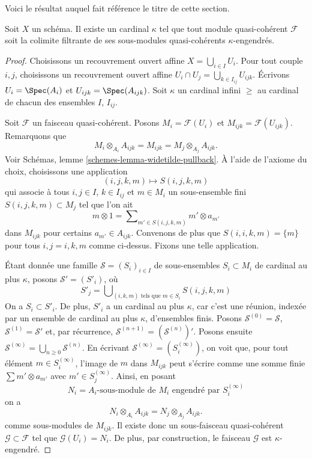\noindent
Voici le résultat auquel fait référence le titre de cette section.

\begin{lemma}
\label{lemma-colimit-kappa}
Soit $X$ un schéma. Il existe un cardinal $\kappa$ tel que
tout module quasi-cohérent $\mathcal{F}$ soit la colimite filtrante
de ses sous-modules quasi-cohérents $\kappa$-engendrés.
\end{lemma}

\begin{proof}
Choisissons un recouvrement ouvert affine $X = \bigcup_{i \in I} U_i$. Pour tout couple
$i, j$, choisissons un recouvrement ouvert affine
$U_i \cap U_j = \bigcup_{k \in I_{ij}} U_{ijk}$.
Écrivons $U_i = \Spec(A_i)$ et $U_{ijk} = \Spec(A_{ijk})$.
Soit $\kappa$ un cardinal infini $\geq$ au cardinal
de chacun des ensembles $I$, $I_{ij}$.

\medskip\noindent
Soit $\mathcal{F}$ un faisceau quasi-cohérent. Posons $M_i = \mathcal{F}(U_i)$
et $M_{ijk} = \mathcal{F}(U_{ijk})$. Remarquons que
$$
M_i \otimes_{A_i} A_{ijk} = M_{ijk} = M_j \otimes_{A_j} A_{ijk}.
$$
Voir
Schémas, lemme \ref{schemes-lemma-widetilde-pullback}.
À l'aide de l'axiome du choix, choisissons une application
$$
(i, j, k, m) \mapsto S(i, j, k, m)
$$
qui associe à tous $i, j \in I$, $k \in I_{ij}$ et $m \in M_i$
un sous-ensemble fini $S(i, j, k, m) \subset M_j$ tel que l'on ait
$$
m \otimes 1 = \sum\nolimits_{m' \in S(i, j, k, m)} m' \otimes a_{m'}
$$
dans $M_{ijk}$ pour certains $a_{m'} \in A_{ijk}$. Convenons de plus
que $S(i, i, k, m) = \{m\}$ pour tous $i, j = i, k, m$ comme ci-dessus.
Fixons une telle application.

\medskip\noindent
Étant donnée une famille $\mathcal{S} = (S_i)_{i \in I}$ de sous-ensembles
$S_i \subset M_i$ de cardinal au plus $\kappa$, posons
$\mathcal{S}' = (S'_i)$, où
$$
S'_j = \bigcup\nolimits_{(i, k, m)\text{ tels que }m \in S_i}
S(i, j, k, m)
$$
On a $S_i \subset S'_i$. De plus, $S'_i$ a un cardinal au plus
$\kappa$, car c'est une réunion, indexée par un ensemble de cardinal au plus $\kappa$,
d'ensembles finis. Posons $\mathcal{S}^{(0)} = \mathcal{S}$,
$\mathcal{S}^{(1)} = \mathcal{S}'$ et, par récurrence,
$\mathcal{S}^{(n + 1)} = (\mathcal{S}^{(n)})'$. Posons ensuite
$\mathcal{S}^{(\infty)} = \bigcup_{n \geq 0} \mathcal{S}^{(n)}$.
En écrivant $\mathcal{S}^{(\infty)} = (S^{(\infty)}_i)$, on voit que,
pour tout élément $m \in S^{(\infty)}_i$, l'image de $m$ dans
$M_{ijk}$ peut s'écrire comme une somme finie $\sum m' \otimes a_{m'}$
avec $m' \in S_j^{(\infty)}$. Ainsi, en posant
$$
N_i = A_i\text{-sous-module de }M_i\text{ engendré par }S^{(\infty)}_i
$$
on a
$$
N_i \otimes_{A_i} A_{ijk} = N_j \otimes_{A_j} A_{ijk}.
$$
comme sous-modules de $M_{ijk}$. Il existe donc un sous-faisceau quasi-cohérent
$\mathcal{G} \subset \mathcal{F}$ tel que $\mathcal{G}(U_i) = N_i$.
De plus, par construction, le faisceau $\mathcal{G}$ est $\kappa$-engendré.


\end{proof}
